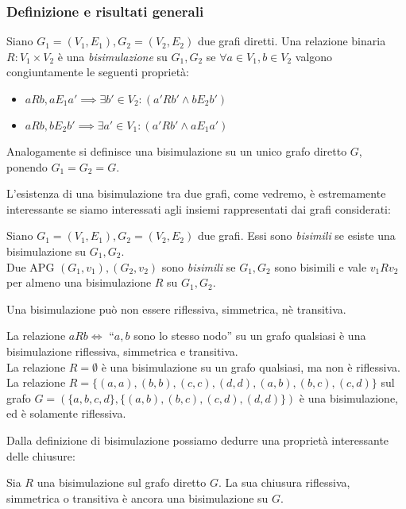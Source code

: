 \subsubsection{Definizione e risultati generali}
\begin{definition}
    Siano $G_1 = (V_1,E_1), G_2 = (V_2,E_2)$ due grafi diretti. Una relazione binaria $R: V_1 \times V_2$ è una \emph{bisimulazione} su $G_1, G_2$ se $\forall a \in V_1, b \in V_2$ valgono congiuntamente le seguenti proprietà:
    \begin{itemize}
        \item $a R b, a E_1 a' \implies \exists b' \in V_2 : (a' R b' \land b E_2 b')$
        \item $a R b, b E_2 b' \implies \exists a' \in V_1 : (a' R b' \land a E_1 a')$
    \end{itemize}
    Analogamente si definisce una bisimulazione su un unico grafo diretto $G$, ponendo $G_1 = G_2 = G$.
\end{definition}
L'esistenza di una bisimulazione tra due grafi, come vedremo, è estremamente interessante se siamo interessati agli insiemi rappresentati dai grafi considerati:
\begin{definition}
    Siano $G_1 = (V_1,E_1), G_2 = (V_2,E_2)$ due grafi. Essi sono \emph{bisimili} se esiste una bisimulazione su $G_1, G_2$.\\
    Due APG $(G_1, v_1), (G_2, v_2)$ sono \emph{bisimili} se $G_1, G_2$ sono bisimili e vale $v_1 R v_2$ per almeno una bisimulazione $R$ su $G_1, G_2$.
\end{definition}
\begin{observation}
    Una bisimulazione può non essere riflessiva, simmetrica, nè transitiva.
\end{observation}
\begin{example}
    La relazione $a R b \iff$ ``$a,b$ sono lo stesso nodo'' su un grafo qualsiasi è una bisimulazione riflessiva, simmetrica e transitiva.\\
    La relazione $R = \emptyset$ è una bisimulazione su un grafo qualsiasi, ma non è riflessiva.\\
    La relazione $R = \{(a,a),(b,b),(c,c),(d,d),(a,b),(b,c),(c,d)\}$ sul grafo $G = (\{a,b,c,d\}, \{(a,b),(b,c),(c,d),(d,d)\})$ è una bisimulazione, ed è solamente riflessiva.
\end{example}
Dalla definizione di bisimulazione possiamo dedurre una proprietà interessante delle chiusure:
\begin{theorem}
    Sia $R$ una bisimulazione sul grafo diretto $G$. La sua chiusura riflessiva, simmetrica o transitiva è ancora una bisimulazione su $G$.
\end{theorem}
